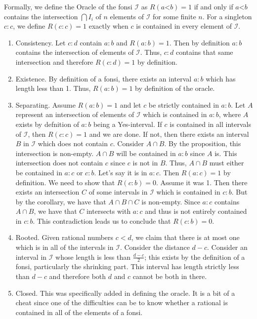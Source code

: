 \documentclass[12pt]{article}
\theoremstyle{remark}
\newcommand{\lt}{\mathord{<}}
\begin{document}
Formally, we define the Oracle of the fonsi $\mathcal{I}$ as $R(a \lt b) = 1$ if and only if $a \lt b$ contains the intersection $\bigcap I_i$ of $n$ elements of $\mathcal{I}$ for some finite $n$. For a singleton $c:c$, we define $R(c:c) = 1$ exactly when $c$ is contained in every element of $\mathcal{I}$. 

\begin{enumerate}
    \item Consistency. Let $c:d$ contain $a:b$ and $R(a:b)=1$. Then by definition $a:b$ contains the intersection of elements of $\mathcal{I}$. Thus, $c:d$ contains that same  intersection and therefore $R(c:d)=1$ by definition. 
    \item Existence. By definition of a fonsi, there exists an interval $a:b$ which has length less than 1. Thus, $R(a:b)=1$ by definition of the oracle.
    \item Separating. Assume $R(a:b)=1$ and let $c$ be strictly contained in $a:b$. 
    Let $A$ represent an intersection of elements of $\mathcal{I}$ which is contained in 
    $a:b$, where $A$ exists by defnition of $a:b$ being a Yes-interval. If $c$ is contained in all intervals of $\mathcal{I}$, then $R(c:c) =1$ and we are done. If not, then there exists an interval $B$ in $\mathcal{I}$ which does not contain $c$. Consider $A \cap B$. By the proposition, this intersection is non-empty. $A \cap B$ will be contained in $a:b$ since $A$ is.  This intersection does not contain $c$ since $c$ is not in $B$. Thus, $A \cap B$ must either be contained in $a:c$ or $c:b$. Let's say it is in $a:c$. Then $R(a:c) = 1$ by definition. We need to show that $R(c:b) = 0$. Assume it was 1. Then there exists an intersection $C$ of some intervals in $\mathcal{I}$ which is contained in $c:b$. But by the corollary, we have that $A \cap B \cap C$ is non-empty. Since $a:c$ contains $A \cap B$, we have that $C$ intersects with $a:c$ and thus is not entirely contained in $c:b$. This contradiction leads us to conclude that $R(c:b) = 0$.
    \item Rooted. Given rational numbers $c < d$, we claim that there is at most one which is in all of the intervals in $\mathcal{I}$. Consider the distance $d-c$. Consider an  interval in $\mathcal{I}$ whose length is less than $\tfrac{d-c}{2}$; this exists by the definition of a fonsi, particularly the shrinking part. This interval has length strictly less than $d-c$ and therefore both $d$ and $c$ cannot be both in there. 
    \item Closed. This was specifically added in defining the oracle. It is a bit of a cheat since one of the difficulties can be to know whether a rational is contained in all of the elements of a fonsi. 
\end{enumerate}
\end{document}
